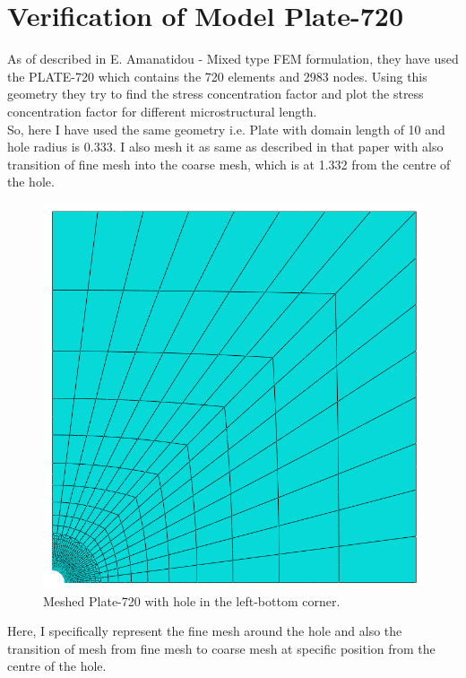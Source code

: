\documentclass[12pt]{article}
\begin{document}
\newpage
\section{Verification of Model Plate-720}
As of described in E. Amanatidou - Mixed type FEM formulation, they have used the PLATE-720 which contains the 720 elements and 2983 nodes. Using this geometry they try to find the stress concentration factor and plot the stress concentration factor for different microstructural length.
\\
So, here I have used the same geometry i.e. Plate with domain length of 10 and hole radius is 0.333. I also mesh it as same as described in that paper with also transition of fine mesh into the coarse mesh, which is at 1.332 from the centre of the hole.   
\begin{figure}[H]
	\begin{center}
		\includegraphics[scale=0.35]{mesh_part.png} 
	\end{center}  
   \caption{Meshed Plate-720 with hole in the left-bottom corner.}
\end{figure}
Here, I specifically represent the fine mesh around the hole and also the transition of mesh from fine mesh to coarse mesh at specific position from the centre of the hole.
\end{document}

